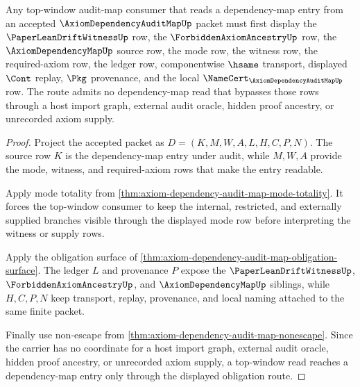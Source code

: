 \begin{theorem}
\label{thm:axiom-dependency-audit-map-top-window-obligation-route}
Any top-window audit-map consumer that reads a dependency-map entry from an accepted $\AxiomDependencyAuditMapUp$ packet must first display the $\PaperLeanDriftWitnessUp$ row, the $\ForbiddenAxiomAncestryUp$ row, the $\AxiomDependencyMapUp$ source row, the mode row, the witness row, the required-axiom row, the ledger row, componentwise $\hsame$ transport, displayed $\Cont$ replay, $\Pkg$ provenance, and the local $\NameCert_{\AxiomDependencyAuditMapUp}$ row. The route admits no dependency-map read that bypasses those rows through a host import graph, external audit oracle, hidden proof ancestry, or unrecorded axiom supply.
\end{theorem}
\begin{proof}
Project the accepted packet as $D=(K,M,W,A,L,H,C,P,N)$. The source row $K$ is the dependency-map entry under audit, while $M,W,A$ provide the mode, witness, and required-axiom rows that make the entry readable.

Apply mode totality from \autoref{thm:axiom-dependency-audit-map-mode-totality}. It forces the top-window consumer to keep the internal, restricted, and externally supplied branches visible through the displayed mode row before interpreting the witness or supply rows.

Apply the obligation surface of \autoref{thm:axiom-dependency-audit-map-obligation-surface}. The ledger $L$ and provenance $P$ expose the $\PaperLeanDriftWitnessUp$, $\ForbiddenAxiomAncestryUp$, and $\AxiomDependencyMapUp$ siblings, while $H,C,P,N$ keep transport, replay, provenance, and local naming attached to the same finite packet.

Finally use non-escape from \autoref{thm:axiom-dependency-audit-map-nonescape}. Since the carrier has no coordinate for a host import graph, external audit oracle, hidden proof ancestry, or unrecorded axiom supply, a top-window read reaches a dependency-map entry only through the displayed obligation route.
\end{proof}

